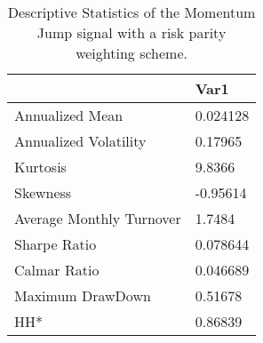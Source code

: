 \begin{table}[H]
\centering
\begin{tabular}{ll}
& Var1 \\ 
\hline 
Annualized Mean & 0.024128 \\ 
Annualized Volatility & 0.17965 \\ 
Kurtosis & 9.8366 \\ 
Skewness & -0.95614 \\ 
Average Monthly Turnover & 1.7484 \\ 
Sharpe Ratio & 0.078644 \\ 
Calmar Ratio & 0.046689 \\ 
Maximum DrawDown & 0.51678 \\ 
HH* & 0.86839 \\ 
\hline
\end{tabular}
\caption{Descriptive Statistics of the Momentum Jump signal with a risk parity weighting scheme.}
\label{MOMJUMPRP}
\end{table}